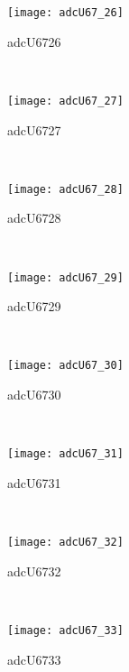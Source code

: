 \begin{figure}[h]
    \centering
    \begin{subfigure}[h]{0.3\textwidth}
        \centering
        \texttt{[image: adcU67\_26]}
        \caption{adcU6726}
        \label{fig:adcU67_26}
    \end{subfigure}
    ~
    \begin{subfigure}[h]{0.3\textwidth}
        \centering
        \texttt{[image: adcU67\_27]}
        \caption{adcU6727}
        \label{fig:adcU67_27}
    \end{subfigure}
    ~
    \begin{subfigure}[h]{0.3\textwidth}
        \centering
        \texttt{[image: adcU67\_28]}
        \caption{adcU6728}
        \label{fig:adcU67_28}
    \end{subfigure}
    \\
    \begin{subfigure}[h]{0.3\textwidth}
        \centering
        \texttt{[image: adcU67\_29]}
        \caption{adcU6729}
        \label{fig:adcU67_29}
    \end{subfigure}
    ~
    \begin{subfigure}[h]{0.3\textwidth}
        \centering
        \texttt{[image: adcU67\_30]}
        \caption{adcU6730}
        \label{fig:adcU67_30}
    \end{subfigure}
    ~
    \begin{subfigure}[h]{0.3\textwidth}
        \centering
        \texttt{[image: adcU67\_31]}
        \caption{adcU6731}
        \label{fig:adcU67_31}
    \end{subfigure}
    \\
    \begin{subfigure}[h]{0.3\textwidth}
        \centering
        \texttt{[image: adcU67\_32]}
        \caption{adcU6732}
        \label{fig:adcU67_32}
    \end{subfigure}
    ~
    \begin{subfigure}[h]{0.3\textwidth}
        \centering
        \texttt{[image: adcU67\_33]}
        \caption{adcU6733}
        \label{fig:adcU67_33}
    \end{subfigure}
    ~
    \begin{subfigure}[h]{0.3\textwidth}

\end{subfigure}
\end{figure}
